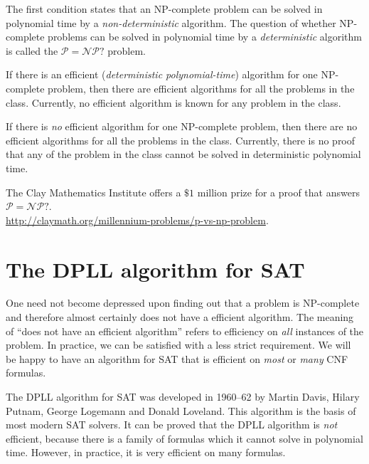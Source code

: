 \documentclass[11pt,a4paper]{article}
\begin{document}
The first condition states that an NP-complete problem can be solved in polynomial time by a \emph{non-deterministic} algorithm. The question of whether NP-complete problems can be solved in polynomial time by a \emph{deterministic} algorithm is called the $\mathcal{P}=\mathcal{NP}?$ problem.

If there is an efficient (\emph{deterministic polynomial-time}) algorithm for one NP-complete problem, then there are efficient algorithms for all the problems in the class. Currently, no efficient algorithm is known for any problem in the class.

If there is \emph{no} efficient algorithm for one NP-complete problem, then there are no efficient algorithms for all the problems in the class. Currently, there is no proof that any of the problem in the class cannot be solved in deterministic polynomial time.

The Clay Mathematics Institute offers a $\$1$ million prize for a proof that answers $\mathcal{P}=\mathcal{NP}?$.\\ \url{http://claymath.org/millennium-problems/p-vs-np-problem}.

\section{The DPLL algorithm for SAT}

One need not become depressed upon finding out that a problem is NP-complete and therefore almost certainly does not have a efficient algorithm. The meaning of ``does not have an efficient algorithm'' refers to efficiency on \emph{all} instances of the problem. In practice, we can be satisfied with a less strict requirement. We will be happy to have an algorithm for SAT that is efficient on \emph{most} or \emph{many} CNF formulas.

The DPLL algorithm for SAT was developed in 1960--62 by Martin Davis, Hilary Putnam, George Logemann and Donald Loveland. This algorithm is the basis of most modern SAT solvers. It can be proved that the DPLL algorithm is \emph{not} efficient, because there is a family of formulas which it cannot solve in polynomial time. However, in practice, it is very efficient on many formulas.
\end{document}
